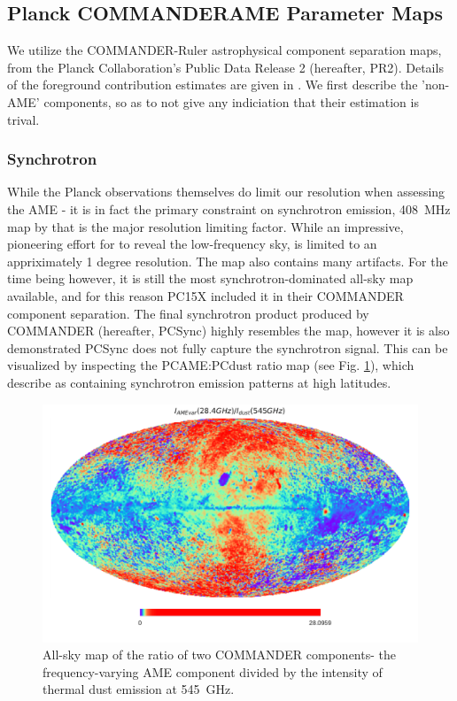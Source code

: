   \subsection{Planck COMMANDERAME Parameter Maps}

       We utilize the COMMANDER-Ruler astrophysical component separation maps, from the Planck Collaboration's Public Data Release 2 (hereafter, PR2). Details of the foreground contribution estimates are given in \cite{planckXII}. We first describe the 'non-AME' components, so as to not give any indiciation that their estimation is trival.

       \subsubsection{Synchrotron}
        While the Planck observations themselves do limit our resolution when assessing the AME - it is in fact the primary constraint on synchrotron emission, 408~MHz map by \cite{haslam82} that is the major resolution limiting factor. While an impressive, pioneering effort for to reveal the low-frequency sky, \citep{haslam82} is limited to an appriximately 1 degree resolution. The map also contains
        many artifacts. For the time being however, it is still the most synchrotron-dominated all-sky map available, and for this reason PC15X included it in their COMMANDER component separation. The final synchrotron product produced by COMMANDER (hereafter, PCSync) highly resembles the \citep{haslam82} map, however it is also demonstrated PCSync does not fully capture the synchrotron signal. This can be visualized by inspecting the PCAME:PCdust ratio map (see Fig. \ref{fig:R_PCAMEtoPCdust}), which \cite{hensley17} describe as containing synchrotron emission patterns at high latitudes.

        \begin{figure}
        \label{fig:R_PCAMEtoPCdust}
        \centering
        \includegraphics[width=\textwidth]{../Plots/ch_datasources/R_PCAMEtoPCRad.pdf}
        \caption{All-sky map of the ratio of two COMMANDER components- the frequency-varying AME component divided by the intensity of thermal dust emission at 545~GHz. }
        \end{figure}

